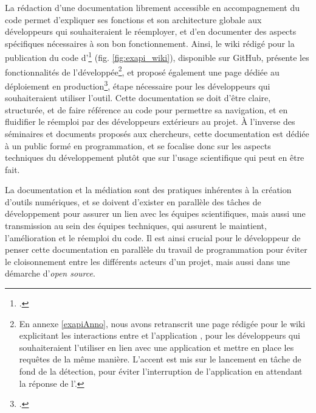    La rédaction d'une documentation librement accessible en accompagnement du code permet d'expliquer ses fonctions et son architecture globale aux développeurs qui souhaiteraient le réemployer, et d'en documenter des aspects spécifiques nécessaires à son bon fonctionnement. Ainsi, le wiki rédigé pour la publication du code d'\exapi\footcite{ExtractorAPIWiki2023} (fig. \ref{fig:exapi_wiki}), disponible sur GitHub, présente les fonctionnalités de l'\api développée\footnote{En annexe \ref{exapiAnno}, nous avons retranscrit une page rédigée pour le wiki explicitant les interactions entre \exapi et l'application \eida, pour les développeurs qui souhaiteraient l'utiliser en lien avec une application et mettre en place les requêtes de la même manière. L'accent est mis sur le lancement en tâche de fond de la détection, pour éviter l'interruption de l'application en attendant la réponse de l'\api.}, et proposé également une page dédiée au déploiement en production\footcite{DeploymentProductiona}, étape nécessaire pour les développeurs qui souhaiteraient utiliser l'outil. Cette documentation se doit d'être claire, structurée, et de faire référence au code pour permettre sa navigation, et en fluidifier le réemploi par des développeurs extérieurs au projet. À l'inverse des séminaires et documents proposés aux chercheurs, cette documentation est dédiée à un public formé en programmation, et se focalise donc sur les aspects techniques du développement plutôt que sur l'usage scientifique qui peut en être fait.
    
	La documentation et la médiation sont des pratiques inhérentes à la création d'outils numériques, et se doivent d'exister en parallèle des tâches de développement pour assurer un lien avec les équipes scientifiques, mais aussi une transmission au sein des équipes techniques, qui assurent le maintient, l'amélioration et le réemploi du code. Il est ainsi crucial pour le développeur de penser cette documentation en parallèle du travail de programmation pour éviter le cloisonnement entre les différents acteurs d'un projet, mais aussi dans une démarche d'\textit{open source}.

